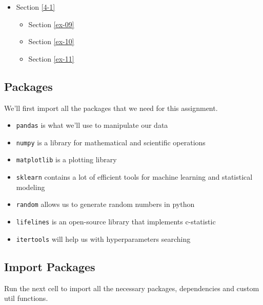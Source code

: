 \documentclass[11pt]{article}
\providecommand{\tightlist}{%
      \setlength{\itemsep}{0pt}\setlength{\parskip}{0pt}}
\begin{document}
\begin{itemize}
  \begin{itemize}
  \tightlist
  \item
    Section \ref{4-1}

    \begin{itemize}
    \tightlist
    \item
      Section \ref{ex-09}
    \item
      Section \ref{ex-10}
    \item
      Section \ref{ex-11}
    \end{itemize}
  \end{itemize}
\end{itemize}

    \hypertarget{packages}{%
\subsection{Packages}\label{packages}}

We'll first import all the packages that we need for this assignment.

\begin{itemize}
\tightlist
\item
  \texttt{pandas} is what we'll use to manipulate our data
\item
  \texttt{numpy} is a library for mathematical and scientific operations
\item
  \texttt{matplotlib} is a plotting library
\item
  \texttt{sklearn} contains a lot of efficient tools for machine
  learning and statistical modeling
\item
  \texttt{random} allows us to generate random numbers in python
\item
  \texttt{lifelines} is an open-source library that implements
  c-statistic
\item
  \texttt{itertools} will help us with hyperparameters searching
\end{itemize}

\hypertarget{import-packages}{%
\subsection{Import Packages}\label{import-packages}}

Run the next cell to import all the necessary packages, dependencies and
custom util functions.
\end{document}

